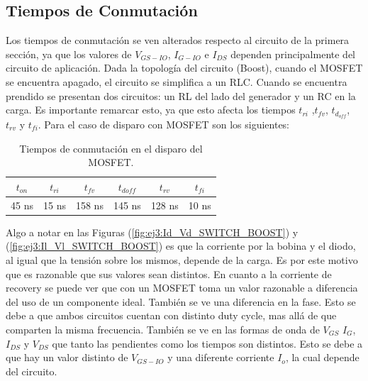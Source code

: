 \subsection{Tiempos de Conmutación}
Los tiempos de conmutación se ven alterados respecto al circuito de la primera sección, ya que los valores de $V_{GS-IO}$, $I_{G-IO}$ e $I_{DS}$ dependen principalmente del circuito de aplicación. Dada la topología del circuito (Boost), cuando el MOSFET se encuentra apagado, el circuito se simplifica a un RLC. Cuando se encuentra prendido se presentan dos circuitos: un RL del lado del generador y un RC en la carga. Es importante remarcar esto, ya que esto afecta los tiempos $t_{ri}$ ,$t_{fv}$, $t_{d_{off}}$, $t_{rv}$ y  $t_{fi}$. Para el caso de disparo con MOSFET son los siguientes:
\vspace*{-1cm}
\begin{table}[H]
\center
\begin{tabular}{cccccc}
\hline
$t_{on}$ & $t_{ri}$ & $t_{fv}$ & $t_{doff}$ & $t_{rv}$ & $t_{fi}$          \\	\hline
45 ns       & 15 ns       & 158 ns      & 145 ns        & 128 ns      & 10 ns     \\	 	\hline
\end{tabular}
\caption{Tiempos de conmutación en el disparo del MOSFET.}
\end{table}
\vspace*{-1.5cm}
Algo a notar en las Figuras (\ref{fig:ej3:Id_Vd_SWITCH_BOOST}) y (\ref{fig:ej3:Il_Vl_SWITCH_BOOST}) es que la corriente por la bobina y el diodo, al igual que la tensión sobre los mismos, depende de la carga. Es por este motivo que es razonable que sus valores sean distintos. En cuanto a la corriente de recovery se puede ver que con un MOSFET toma un valor razonable a diferencia del uso de un componente ideal. También se ve una diferencia en la fase. Esto se debe a que ambos circuitos cuentan con distinto duty cycle, mas allá de que comparten la misma frecuencia. 
También se ve en las formas de onda de $V_{GS}$ $I_G$, $I_{DS}$ y $V_{DS}$ que tanto las pendientes como los tiempos son distintos. Esto se debe a que hay un valor distinto de $V_{GS-IO}$ y una diferente corriente $I_o$, la cual depende del circuito.
